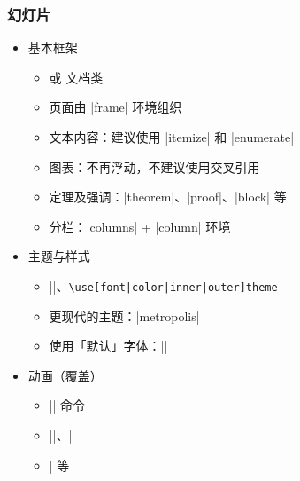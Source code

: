 \begin{frame}[fragile]
\frametitle{幻灯片}
\begin{itemize}
  \item<+-> 基本框架

    \begin{itemize}
      \item {} 或  文档类
      \item 页面由 |frame| 环境组织
      \item 文本内容：建议使用 |itemize| 和 |enumerate|
      \item 图表：不再浮动，不建议使用交叉引用
      \item 定理及强调：|theorem|、|proof|、|block| 等
      \item 分栏：|columns| + |column| 环境
    \end{itemize}

  \item<+-> 主题与样式

    \begin{itemize}
      \item |\usetheme|、\lstinline[style=style@inline]+\use[font|color|inner|outer]theme+
      \item 更现代的主题：|metropolis|
      \item 使用「默认」字体：||
    \end{itemize}

  \item<+-> 动画（覆盖）

    \begin{itemize}
      \item |\pause| 命令
      \item ||、|\item<1->| 等
    \end{itemize}
\end{itemize}
\end{frame}
